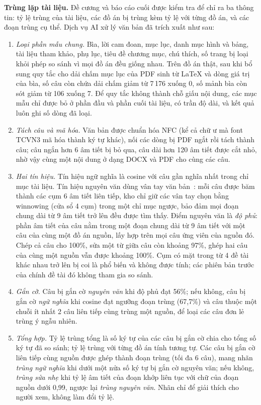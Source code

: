 \documentclass[../main.tex]{subfiles}
\begin{document}
\textbf{Trùng lặp tài liệu.} Đề cương và báo cáo cuối được kiểm tra để chỉ ra ba thông tin: tỷ lệ trùng của tài liệu, các đồ án bị trùng kèm tỷ lệ với từng đồ án, và các đoạn trùng cụ thể. Dịch vụ AI xử lý văn bản đã trích xuất như sau:
\begin{enumerate}
    \item \textit{Loại phần mẫu chung.} Bìa, lời cam đoan, mục lục, danh mục hình và bảng, tài liệu tham khảo, phụ lục, tiêu đề chương mục, chú thích, số trang bị loại khỏi phép so sánh vì mọi đồ án đều giống nhau. Trên đồ án thật, sau khi bổ sung quy tắc cho dải chấm mục lục của PDF sinh từ LaTeX và dòng giá trị của bìa, số câu còn chứa dải chấm giảm từ 7\,176 xuống 0, số mảnh bìa còn sót giảm từ 106 xuống 7. Để quy tắc không thành chỗ giấu nội dung, các mục mẫu chỉ được bỏ ở phần đầu và phần cuối tài liệu, có trần độ dài, và kết quả luôn ghi số dòng đã loại.
    \item \textit{Tách câu và mã hóa.} Văn bản được chuẩn hóa NFC (kể cả chữ ư mà font TCVN3 mã hóa thành ký tự khác), nối các dòng bị PDF ngắt rồi tách thành câu; câu ngắn hơn 6 âm tiết bị bỏ qua, câu dài hơn 120 âm tiết được cắt nhỏ, nhờ vậy cùng một nội dung ở dạng DOCX và PDF cho cùng các câu.
    \item \textit{Hai tín hiệu.} Tín hiệu ngữ nghĩa là cosine với câu gần nghĩa nhất trong chỉ mục tài liệu. Tín hiệu nguyên văn dùng vân tay văn bản~\cite{schleimer2003,sorokina2006}: mỗi câu được băm thành các cụm 6 âm tiết liên tiếp, kho chỉ giữ các vân tay chọn bằng winnowing (cửa sổ 4 cụm) trong một chỉ mục ngược, bảo đảm mọi đoạn chung dài từ 9 âm tiết trở lên đều được tìm thấy. Điểm nguyên văn là \textit{độ phủ}: phần âm tiết của câu nằm trong một đoạn chung dài từ 9 âm tiết với một câu của cùng một đồ án nguồn, lấy hợp trên mọi câu ứng viên của nguồn đó. Chép cả câu cho 100\%, sửa một từ giữa câu còn khoảng 97\%, ghép hai câu của cùng một nguồn vẫn được khoảng 100\%. Cụm có mặt trong từ 4 đề tài khác nhau trở lên bị coi là phổ biến và không được tính; các phiên bản trước của chính đề tài đó không tham gia so sánh.
    \item \textit{Gắn cờ.} Câu bị gắn cờ \textit{nguyên văn} khi độ phủ đạt 56\%; nếu không, câu bị gắn cờ \textit{ngữ nghĩa} khi cosine đạt ngưỡng đoạn trùng (67,7\%) và câu thuộc một chuỗi ít nhất 2 câu liên tiếp cùng trùng một nguồn, để loại các câu đơn lẻ trùng ý ngẫu nhiên.
    \item \textit{Tổng hợp.} Tỷ lệ trùng tổng là số ký tự của các câu bị gắn cờ chia cho tổng số ký tự đã so sánh; tỷ lệ trùng với từng đồ án tính tương tự. Các câu bị gắn cờ liên tiếp cùng nguồn được ghép thành đoạn trùng (tối đa 6 câu), mang nhãn \textit{trùng ngữ nghĩa} khi dưới một nửa số ký tự bị gắn cờ nguyên văn; nếu không, \textit{trùng sửa nhẹ} khi tỷ lệ âm tiết của đoạn khớp liên tục với chữ của đoạn nguồn dưới 0,99, ngược lại \textit{trùng nguyên văn}. Nhãn chỉ để giải thích cho người xem, không làm đổi tỷ lệ.
\end{enumerate}
\end{document}

